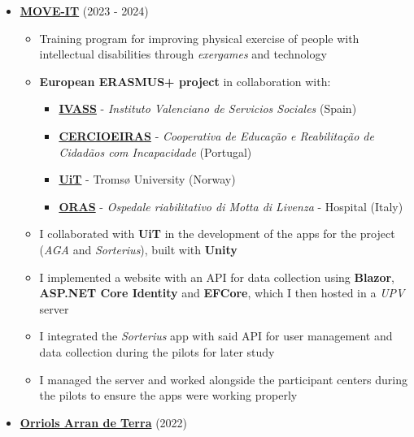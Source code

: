 \documentclass[letterpaper, 12pt, dvipsnames]{article}
\begin{document}
\vspace{1em}

\begin{itemize}
    \item {\large\textbf{\href{https://moveit.webs.upv.es/}{MOVE-IT}}} (2023 - 2024)
          \begin{itemize}
              \item Training program for improving physical exercise of people with intellectual disabilities through \textit{exergames} and technology
              \item \textbf{European ERASMUS+ project} in collaboration with:
                    \begin{itemize}
                        \item \textbf{\href{https://www.ivass.gva.es/}{IVASS}} - \textit{Instituto Valenciano de Servicios Sociales} (Spain)
                        \item \textbf{\href{https://www.cercioeiras.pt/pt}{CERCIOEIRAS}} - \textit{Cooperativa de Educação e Reabilitação de Cidadãos com Incapacidade} (Portugal)
                        \item \textbf{\href{https://en.uit.no/}{UiT}} - Tromsø University (Norway)
                        \item \textbf{\href{https://www.ospedalemotta.it/it/}{ORAS}} - \textit{Ospedale riabilitativo di Motta di Livenza} - Hospital (Italy)
                    \end{itemize}
              \item I collaborated with \textbf{UiT} in the development of the apps for the project (\textit{AGA} and \textit{Sorterius}), built with \textbf{Unity}
              \item I implemented a website with an API for data collection using \textbf{Blazor}, \textbf{ASP.NET Core Identity} and \textbf{EFCore}, which I then hosted in a \textit{UPV} server
              \item I integrated the \textit{Sorterius} app with said API for user management and data collection during the pilots for later study
              \item I managed the server and worked alongside the participant centers during the pilots to ensure the apps were working properly
          \end{itemize}
    \item {\large\textbf{\href{https://orriolsarrandeterra.com/}{Orriols Arran de Terra}}} (2022)
          \begin{itemize}

\end{itemize}
\end{itemize}
\end{document}
